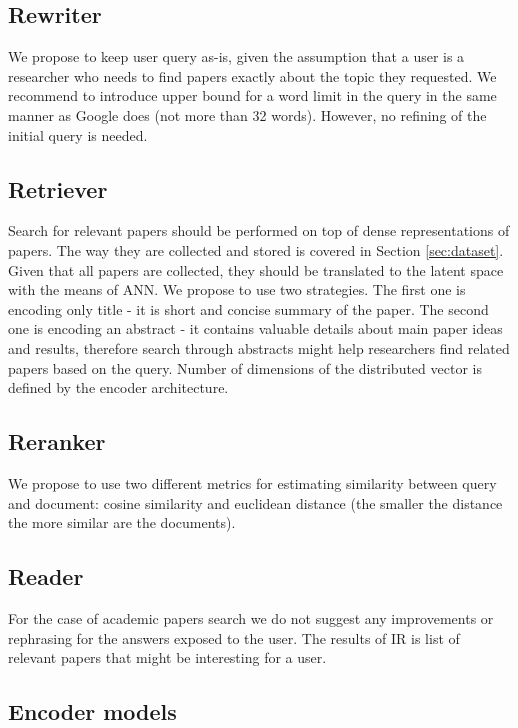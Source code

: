 \documentclass{article}
\begin{document}
    \subsection{Rewriter}
    
        We propose to keep user query as-is, given the assumption that a user is a researcher who needs to find papers exactly about the topic they requested. We recommend to introduce upper bound for a word limit in the query in the same manner as Google does (not more than 32 words). However, no refining of the initial query is needed.

    \subsection{Retriever}
    
        Search for relevant papers should be performed on top of dense representations of papers. The way they are collected and stored is covered in Section \ref{sec:dataset}. Given that all papers are collected, they should be translated to the latent space with the means of ANN. We propose to use two strategies. The first one is encoding only title - it is short and concise summary of the paper. The second one is encoding an abstract - it contains valuable details about main paper ideas and results, therefore search through abstracts might help researchers find related papers based on the query. Number of dimensions of the distributed vector is defined by the encoder architecture.

    \subsection{Reranker}

        We propose to use two different metrics for estimating similarity between query and document: cosine similarity and euclidean distance (the smaller the distance the more similar are the documents).
        
    \subsection{Reader}

        For the case of academic papers search we do not suggest any improvements or rephrasing for the answers exposed to the user. The results of IR is list of relevant papers that might be interesting for a user.

    
    \subsection{Encoder models}
        
\end{document}
